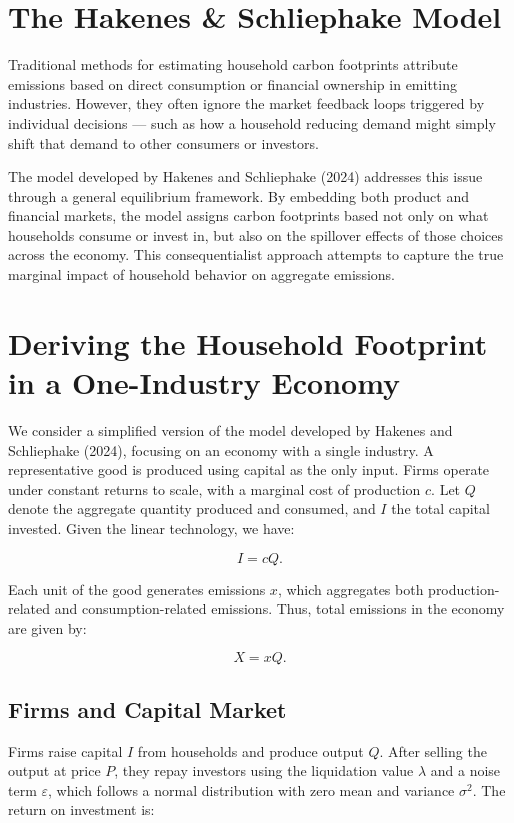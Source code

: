 \documentclass[12pt,a4paper]{article}
\begin{document}
\section*{The Hakenes \& Schliephake Model}

Traditional methods for estimating household carbon footprints attribute emissions based on direct consumption or financial ownership in emitting industries. However, they often ignore the market feedback loops triggered by individual decisions — such as how a household reducing demand might simply shift that demand to other consumers or investors.

The model developed by Hakenes and Schliephake (2024) addresses this issue through a general equilibrium framework. By embedding both product and financial markets, the model assigns carbon footprints based not only on what households consume or invest in, but also on the spillover effects of those choices across the economy. This consequentialist approach attempts to capture the true marginal impact of household behavior on aggregate emissions.

\section{Deriving the Household Footprint in a One-Industry Economy}

We consider a simplified version of the model developed by Hakenes and Schliephake (2024), focusing on an economy with a single industry. A representative good is produced using capital as the only input. Firms operate under constant returns to scale, with a marginal cost of production $c$. Let $Q$ denote the aggregate quantity produced and consumed, and $I$ the total capital invested. Given the linear technology, we have:

\[
I = cQ.
\]

Each unit of the good generates emissions $x$, which aggregates both production-related and consumption-related emissions. Thus, total emissions in the economy are given by:

\[
X = xQ.
\]

\subsection*{Firms and Capital Market}

Firms raise capital $I$ from households and produce output $Q$. After selling the output at price $P$, they repay investors using the liquidation value $\lambda$ and a noise term $\varepsilon$, which follows a normal distribution with zero mean and variance $\sigma^2$. The return on investment is:
\end{document}
